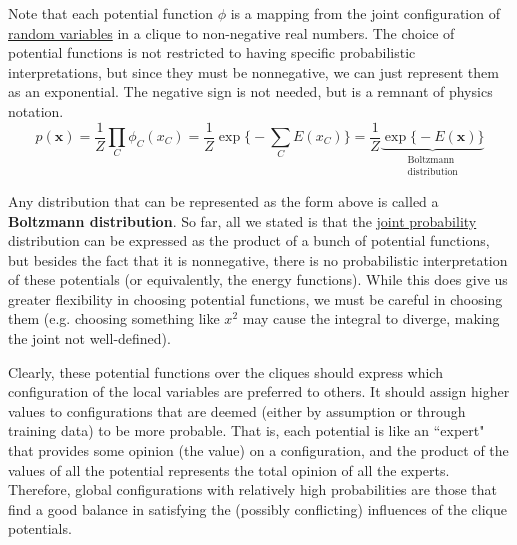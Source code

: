\documentclass{article}
\begin{document}
  Note that each potential function $\phi$ is a mapping from the joint configuration of \hyperref[prob-def:random-variable]{random variables} in a clique to non-negative real numbers. The choice of potential functions is not restricted to having specific probabilistic interpretations, but since they must be nonnegative, we can just represent them as an exponential. The negative sign is not needed, but is a remnant of physics notation. 
  \begin{equation}
    p (\mathbf{x}) = \frac{1}{Z} \prod_C \phi_C (x_C) = \frac{1}{Z} \exp \bigg\{ - \sum_C E(x_C) \bigg\} = \frac{1}{Z} \underbrace{\exp \big\{ - E(\mathbf{x}) \big\}}_{\substack{\text{Boltzmann}\\ \text{distribution}}}
  \end{equation}

  Any distribution that can be represented as the form above is called a \textbf{Boltzmann distribution}. So far, all we stated is that the \hyperref[prob-def:joint-probability-law]{joint probability} distribution can be expressed as the product of a bunch of potential functions, but besides the fact that it is nonnegative, there is no probabilistic interpretation of these potentials (or equivalently, the energy functions). While this does give us greater flexibility in choosing potential functions, we must be careful in choosing them (e.g. choosing something like $x^2$ may cause the integral to diverge, making the joint not well-defined).

  Clearly, these potential functions over the cliques should express which configuration of the local variables are preferred to others. It should assign higher values to configurations that are deemed (either by assumption or through training data) to be more probable. That is, each potential is like an ``expert" that provides some opinion (the value) on a configuration, and the product of the values of all the potential represents the total opinion of all the experts. Therefore, global configurations with relatively high probabilities are those that find a good balance in satisfying the (possibly conflicting) influences of the clique potentials. 
\end{document}
